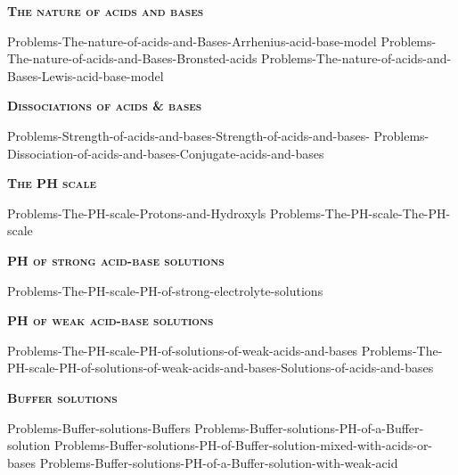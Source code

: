 \documentclass[main.tex]{subfiles}
\newcommand\chapterlabel{Ch-acidbase}
\begin{document}
\newpage
 
\fancyhfoffset[E,O]{0pt}
\setlength{\columnsep}{30pt}
\begin{conclusion}
\end{conclusion}
\begin{multicols*}{2}\setcounter{numA}{1}
{\raggedright\textsc{\textbf{The nature of acids and bases}}\par}
 {Problems-The-nature-of-acids-and-Bases-Arrhenius-acid-base-model}
 {Problems-The-nature-of-acids-and-Bases-Bronsted-acids}
 {Problems-The-nature-of-acids-and-Bases-Lewis-acid-base-model}

{\raggedright\textsc{\textbf{Dissociations of acids \& bases}}\par}
 {Problems-Strength-of-acids-and-bases-Strength-of-acids-and-bases-}
 {Problems-Dissociation-of-acids-and-bases-Conjugate-acids-and-bases}
 
{\raggedright\textsc{\textbf{The PH scale}}\par}
 {Problems-The-PH-scale-Protons-and-Hydroxyls}
 {Problems-The-PH-scale-The-PH-scale}
 
  {\raggedright\textsc{\textbf{PH of strong acid-base solutions}}\par}
 {Problems-The-PH-scale-PH-of-strong-electrolyte-solutions} 

 
 {\raggedright\textsc{\textbf{PH of weak acid-base solutions}}\par}
 {Problems-The-PH-scale-PH-of-solutions-of-weak-acids-and-bases} 
 {Problems-The-PH-scale-PH-of-solutions-of-weak-acids-and-bases-Solutions-of-acids-and-bases} 
	


{\raggedright\textsc{\textbf{Buffer solutions}}\par}
 {Problems-Buffer-solutions-Buffers}
  {Problems-Buffer-solutions-PH-of-a-Buffer-solution}
 {Problems-Buffer-solutions-PH-of-Buffer-solution-mixed-with-acids-or-bases} 
 {Problems-Buffer-solutions-PH-of-a-Buffer-solution-with-weak-acid} 


\end{multicols*}
\end{document}
